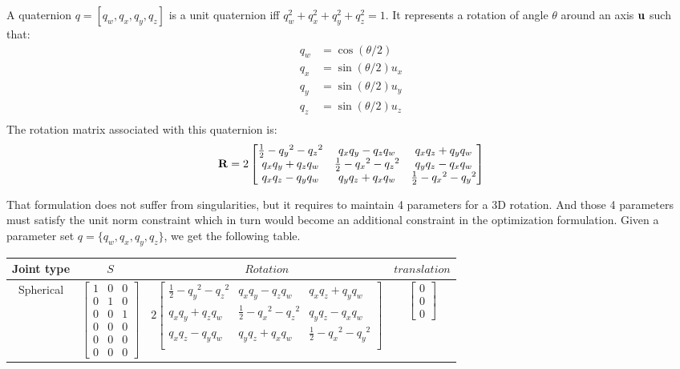 A quaternion $q = [q_w, q_x, q_y, q_z]$ is a unit quaternion iff $q_w^2+q_x^2+q_y^2+q_z^2 = 1$.
It represents a rotation of angle $\theta$ around an axis ${\bf u}$ such that:
\begin{align}
  q_w &= \cos(\theta/2) \\
  q_x &= \sin(\theta/2)u_x \\
  q_y &= \sin(\theta/2)u_y \\
  q_z &= \sin(\theta/2)u_z \\
\end{align}
The rotation matrix associated with this quaternion is:
\begin{equation}
  {\bf R} = 2 \begin{bmatrix}
    \frac{1}{2} - {q_y}^2 - {q_z}^2 &	q_x q_y - q_z q_w &	q_x q_z + q_y q_w \\
    q_x q_y + q_z q_w	& \frac{1}{2} - {q_x}^2 - {q_z}^2 &	q_y q_z - q_x q_w \\
    q_x q_z - q_y q_w &	q_y q_z + q_x q_w	& \frac{1}{2} - {q_x}^2 - {q_y}^2 \\
  \end{bmatrix}
\end{equation}

That formulation does not suffer from singularities, but it requires to maintain 4 parameters for a 3D rotation.
And those 4 parameters must satisfy the unit norm constraint which in turn would become an additional constraint in the optimization formulation.
Given a parameter set $q = \{ q_w, q_x, q_y, q_z\}$, we get the following table.

\begin{table}[ht]
  \centering
  \begin{tabular}{cccc}
    \toprule
    Joint type & $S$ & $Rotation$ & $translation$ \\
    \midrule
    Spherical
    &
    $\begin{bmatrix}
      1 & 0 & 0 \\ 0 & 1 & 0 \\ 0 & 0 & 1 \\ 0 & 0 & 0 \\ 0 & 0 & 0 \\ 0 & 0 & 0
    \end{bmatrix}$
    &
    $2 \begin{bmatrix}
    \frac{1}{2} - {q_y}^2 - {q_z}^2 &	q_x q_y - q_z q_w &	q_x q_z + q_y q_w \\
    q_x q_y + q_z q_w	& \frac{1}{2} - {q_x}^2 - {q_z}^2 &	q_y q_z - q_x q_w \\
    q_x q_z - q_y q_w &	q_y q_z + q_x q_w	& \frac{1}{2} - {q_x}^2 - {q_y}^2 \\
    \end{bmatrix}$
    &
    $\begin{bmatrix}
      0 \\ 0 \\ 0
    \end{bmatrix}$
    \\
    \bottomrule
  \end{tabular}
\end{table}

